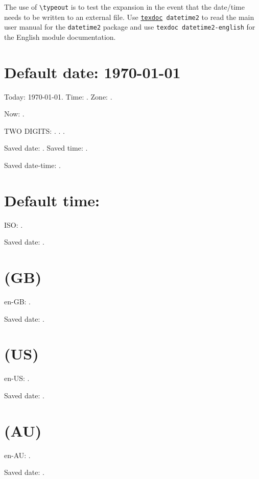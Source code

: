 \documentclass[en-GB,en-US,en-AU]{article}
\begin{document}
\tableofcontents

The use of \verb|\typeout| is to test the expansion in the event
that the date/time needs to be written to an external file.
Use
\texttt{\href{http://www.dickimaw-books.com/latex/novices/html/texdoc.html}{texdoc} datetime2} to read the main user manual for
the \texttt{datetime2} package and use \texttt{texdoc
datetime2-english} for the English module documentation.

\section{Default date: \today}

Today: \today. Time: \DTMcurrenttime. Zone: \DTMcurrentzone.

Now: \DTMnow.

TWO DIGITS: . .
.


Saved date: .
Saved time: .

Saved date-time: .


\section{Default time: }


ISO: \DTMnow.

Saved date: .

\section{(GB) }

en-GB: \DTMnow.

Saved date: .

\section{(US) }

en-US: \DTMnow.

Saved date: .

\section{(AU) }

en-AU: \DTMnow.

Saved date: .
\end{document}
